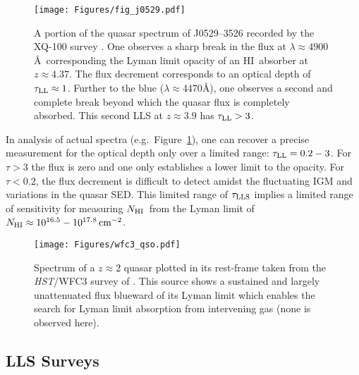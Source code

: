 \documentclass[graybox]{svmult}
\newcommand{\HI}{H{\sc I}}
\newcommand{\mnhi}{N_{\rm HI}}
\newcommand{\nhi}{$\mnhi$}
\def\cm#1{\, {\rm cm^{#1}}}
\begin{document}
%
\begin{figure}[b]
\sidecaption
\texttt{[image: Figures/fig\_j0529.pdf]}
%
%
\caption{A portion of the quasar spectrum of J0529--3526 recorded
by the XQ-100 survey \cite{xq_100}.  One observes a sharp break
in the flux at $\lambda \approx 4900$\AA\ corresponding the 
Lyman limit opacity of an \HI\ absorber at $z \approx 4.37$.
The flux decrement corresponds to an optical depth of 
$\tau_{\rm LL} \approx 1$.  Further to the blue 
($\lambda \approx 4470$\AA), one observes
a second and complete break beyond which the quasar flux
is completely absorbed.  This second LLS at $z \approx 3.9$
has $\tau_{\rm LL} > 3$.
}
\label{fig:j0529}       %
\end{figure}


In analysis of actual spectra (e.g.\ Figure~\ref{fig:j0529}),
one can recover a precise measurement for the optical depth
only over a limited range: $\tau_{\rm LL} = 0.2 - 3$.  
For $\tau > 3$ the flux is zero and one only establishes
a lower limit to the opacity.
For $\tau < 0.2$, the flux decrement is difficult 
to detect amidst the fluctuating IGM and variations in the quasar SED.
This limited range of $\tau_{\rm LLS}$ implies a limited
range of sensitivity for measuring \nhi\ from the Lyman limit
of $\mnhi \approx 10^{16.5} - 10^{17.8} \cm{-2}$.

%
\begin{figure}[b]
\sidecaption
\texttt{[image: Figures/wfc3\_qso.pdf]}
%
%
\caption{Spectrum of a $z \approx 2$ quasar plotted in its
rest-frame taken from the {\it HST}/WFC3 survey of \cite{omeara13}.
This source shows a sustained and largely unattenuated 
flux blueward of its Lyman limit which enables the search for
Lyman limit absorption from intervening gas (none is observed here).
}
\label{fig:wfc3}       %
\end{figure}

\subsection{LLS Surveys}
\end{document}
